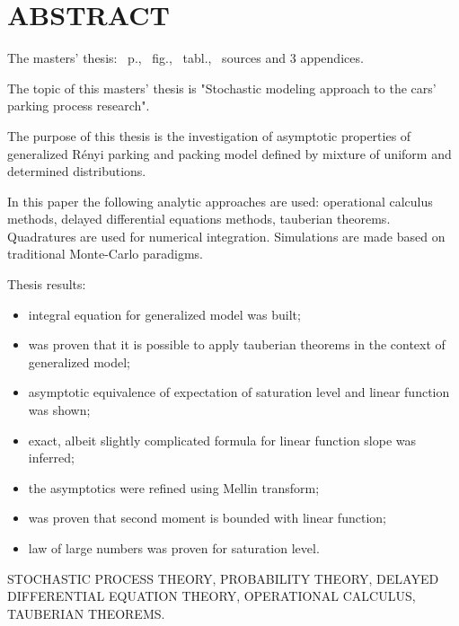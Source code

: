 \chapter*{ABSTRACT}
The masters' thesis: \pageref*{MyLastPage}~p., \totfig~fig., \tottab~tabl., ~sources and 3 appendices.

The topic of this masters' thesis is "Stochastic modeling approach to the cars' parking process research".

The purpose of this thesis is the investigation of asymptotic properties of generalized R{\'e}nyi parking and packing model defined by mixture of uniform and determined distributions. 

In this paper the following analytic approaches are used: operational calculus methods, delayed differential equations methods, tauberian theorems. Quadratures are used for numerical integration. Simulations are made based on traditional Monte-Carlo paradigms.

Thesis results:
\begin{itemize}
	\item integral equation for generalized model was built;
	\item was proven that it is possible to apply tauberian theorems in the context of generalized model;
	\item asymptotic equivalence of expectation of saturation level and linear function was shown;
	\item exact, albeit slightly complicated formula for linear function slope was inferred;
	\item the asymptotics were refined using Mellin transform;
	\item was proven that second moment is bounded with linear function;
	\item law of large numbers was proven for saturation level.
\end{itemize}

\MakeUppercase{stochastic process theory, probability theory, delayed differential equation theory, operational calculus, tauberian theorems.}